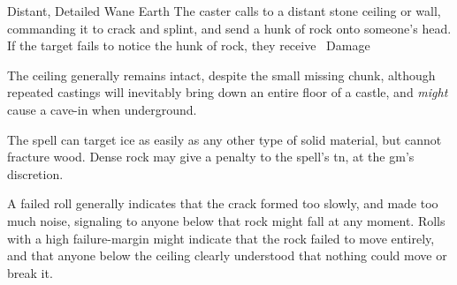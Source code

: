   {Distant, Detailed}%
  {Wane}%
  {Earth}%
  {}%
  {The caster calls to a distant stone ceiling or wall, commanding it to crack and splint, and send a hunk of rock onto someone's head.
    If the target fails to notice the hunk of rock, they receive \showDam\ Damage}%
  {
    The ceiling generally remains intact, despite the small missing chunk, although repeated castings will inevitably bring down an entire floor of a castle, and \emph{might} cause a cave-in when underground.

    The spell can target ice as easily as any other type of solid material, but cannot fracture wood.
    Dense rock may give a penalty to the spell's \gls{tn}, at the \gls{gm}'s discretion.

    A failed roll generally indicates that the crack formed too slowly, and made too much noise, signaling to anyone below that rock might fall at any moment.
    Rolls with a high failure-margin might indicate that the rock failed to move entirely, and that anyone below the ceiling clearly understood that nothing could move or break it.
  }

